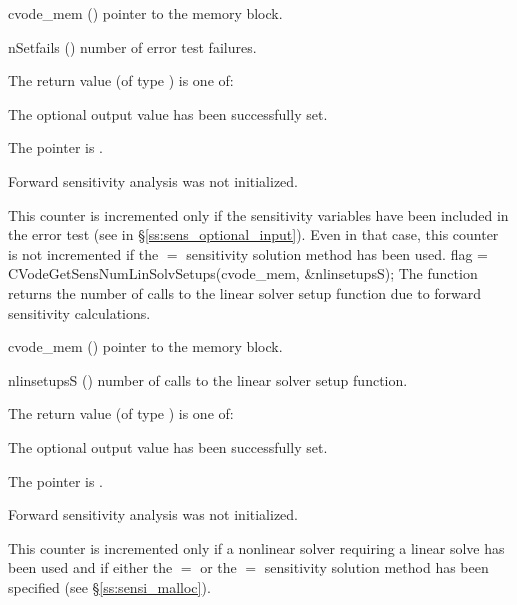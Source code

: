 {
  \begin{args}
  \item[cvode\_mem] ()
    pointer to the {\cvodes} memory block.
  \item[nSetfails] ()
    number of error test failures.
  \end{args}
}
{
  The return value  (of type ) is one of:
  \begin{args}
  \item[\Id{CV\_SUCCESS}] 
    The optional output value has been successfully set.
  \item[\Id{CV\_MEM\_NULL}]
    The  pointer is .
  \item[\Id{CV\_NO\_SENS}]
    Forward sensitivity analysis was not initialized.
  \end{args}
}
{
  This counter is incremented only if the sensitivity variables have been included
  in the error test (see  in \S\ref{ss:sens_optional_input}). 
  Even in that case, this counter is not incremented if the $=$ 
  sensitivity solution method has been used.
}
{
  flag = CVodeGetSensNumLinSolvSetups(cvode\_mem, \&nlinsetupsS);
}
{
  The function  returns the number of calls
  to the linear solver setup function due to forward sensitivity calculations.
}
{
  \begin{args}
  \item[cvode\_mem] ()
    pointer to the {\cvodes} memory block.
  \item[nlinsetupsS] ()
    number of calls to the linear solver setup function.
  \end{args}
}
{
  The return value  (of type ) is one of:
  \begin{args}
  \item[\Id{CV\_SUCCESS}] 
    The optional output value has been successfully set.
  \item[\Id{CV\_MEM\_NULL}]
    The  pointer is .
  \item[\Id{CV\_NO\_SENS}]
    Forward sensitivity analysis was not initialized.
  \end{args}
}
{
  This counter is incremented only if a nonlinear solver requiring a linear
  solve has been used and if either the  $=$  or the
   $=$  sensitivity solution method has been
  specified (see \S\ref{ss:sensi_malloc}).
}
